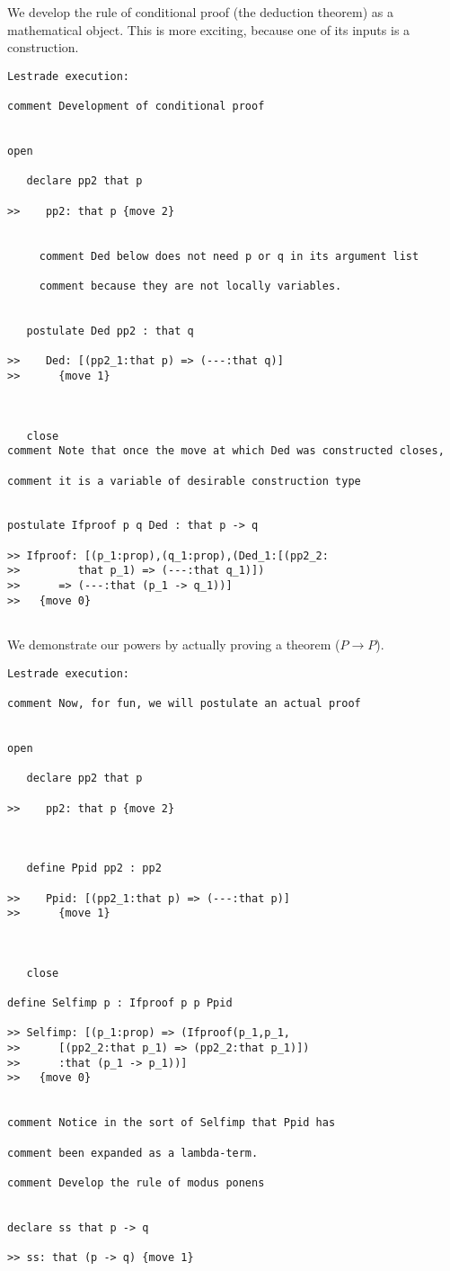 \documentclass[12pt]{article}
\begin{document}
We develop the rule of conditional proof (the deduction theorem) as a mathematical object.  This is more exciting, because one of its inputs is a construction.

\begin{verbatim}Lestrade execution:

comment Development of conditional proof


open

   declare pp2 that p

>>    pp2: that p {move 2}


     comment Ded below does not need p or q in its argument list 

     comment because they are not locally variables.


   postulate Ded pp2 : that q

>>    Ded: [(pp2_1:that p) => (---:that q)]
>>      {move 1}



   close
comment Note that once the move at which Ded was constructed closes, 

comment it is a variable of desirable construction type


postulate Ifproof p q Ded : that p -> q

>> Ifproof: [(p_1:prop),(q_1:prop),(Ded_1:[(pp2_2:
>>         that p_1) => (---:that q_1)])
>>      => (---:that (p_1 -> q_1))]
>>   {move 0}


\end{verbatim}

We demonstrate our powers by actually proving a theorem ($P \rightarrow P$).

\begin{verbatim}Lestrade execution:

comment Now, for fun, we will postulate an actual proof


open

   declare pp2 that p

>>    pp2: that p {move 2}



   define Ppid pp2 : pp2

>>    Ppid: [(pp2_1:that p) => (---:that p)]
>>      {move 1}



   close

define Selfimp p : Ifproof p p Ppid

>> Selfimp: [(p_1:prop) => (Ifproof(p_1,p_1,
>>      [(pp2_2:that p_1) => (pp2_2:that p_1)])
>>      :that (p_1 -> p_1))]
>>   {move 0}


comment Notice in the sort of Selfimp that Ppid has

comment been expanded as a lambda-term.

comment Develop the rule of modus ponens


declare ss that p -> q

>> ss: that (p -> q) {move 1}


\end{verbatim}
\end{document}
